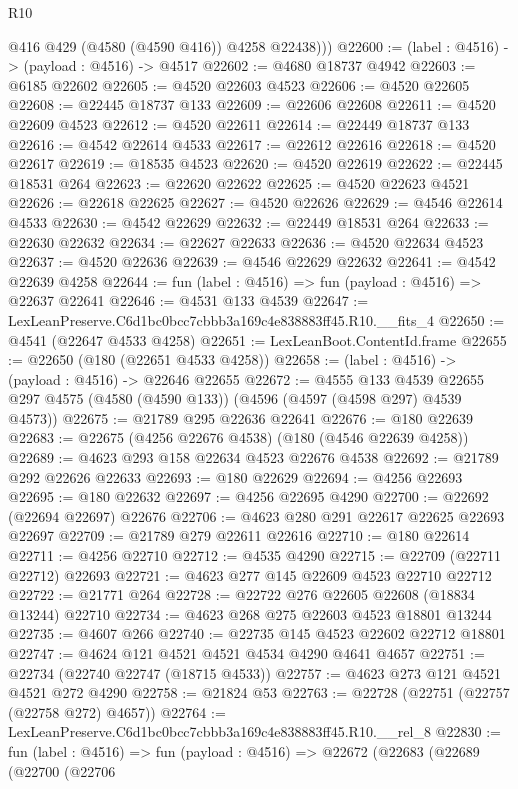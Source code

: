 \begin{lexlean}{R10}
\begin{coremodule}
          @416
          @429
          (@4580 (@4590 @416))
          @4258
          @22438)))
@22600 := (label : @4516) -> (payload : @4516) -> @4517
@22602 := @4680 @18737 @4942
@22603 := @6185 @22602
@22605 := @4520 @22603 @4523
@22606 := @4520 @22605
@22608 := @22445 @18737 @133
@22609 := @22606 @22608
@22611 := @4520 @22609 @4523
@22612 := @4520 @22611
@22614 := @22449 @18737 @133
@22616 := @4542 @22614 @4533
@22617 := @22612 @22616
@22618 := @4520 @22617
@22619 := @18535 @4523
@22620 := @4520 @22619
@22622 := @22445 @18531 @264
@22623 := @22620 @22622
@22625 := @4520 @22623 @4521
@22626 := @22618 @22625
@22627 := @4520 @22626
@22629 := @4546 @22614 @4533
@22630 := @4542 @22629
@22632 := @22449 @18531 @264
@22633 := @22630 @22632
@22634 := @22627 @22633
@22636 := @4520 @22634 @4523
@22637 := @4520 @22636
@22639 := @4546 @22629 @22632
@22641 := @4542 @22639 @4258
@22644 := fun (label : @4516) => fun (payload : @4516) => @22637 @22641
@22646 := @4531 @133 @4539
@22647 := LexLeanPreserve.C6d1bc0bcc7cbbb3a169c4e838883ff45.R10.__fits_4
@22650 := @4541 (@22647 @4533 @4258)
@22651 := LexLeanBoot.ContentId.frame
@22655 := @22650 (@180 (@22651 @4533 @4258))
@22658 := (label : @4516) -> (payload : @4516) -> @22646 @22655
@22672 := @4555
    @133
    @4539
    @22655
    @297
    @4575
    (@4580 (@4590 @133))
    (@4596 (@4597 (@4598 @297) @4539 @4573))
@22675 := @21789 @295 @22636 @22641
@22676 := @180 @22639
@22683 := @22675 (@4256 @22676 @4538) (@180 (@4546 @22639 @4258))
@22689 := @4623 @293 @158 @22634 @4523 @22676 @4538
@22692 := @21789 @292 @22626 @22633
@22693 := @180 @22629
@22694 := @4256 @22693
@22695 := @180 @22632
@22697 := @4256 @22695 @4290
@22700 := @22692 (@22694 @22697) @22676
@22706 := @4623 @280 @291 @22617 @22625 @22693 @22697
@22709 := @21789 @279 @22611 @22616
@22710 := @180 @22614
@22711 := @4256 @22710
@22712 := @4535 @4290
@22715 := @22709 (@22711 @22712) @22693
@22721 := @4623 @277 @145 @22609 @4523 @22710 @22712
@22722 := @21771 @264
@22728 := @22722 @276 @22605 @22608 (@18834 @13244) @22710
@22734 := @4623 @268 @275 @22603 @4523 @18801 @13244
@22735 := @4607 @266
@22740 := @22735 @145 @4523 @22602 @22712 @18801
@22747 := @4624 @121 @4521 @4521 @4534 @4290 @4641 @4657
@22751 := @22734 (@22740 @22747 (@18715 @4533))
@22757 := @4623 @273 @121 @4521 @4521 @272 @4290
@22758 := @21824 @53
@22763 := @22728 (@22751 (@22757 (@22758 @272) @4657))
@22764 := LexLeanPreserve.C6d1bc0bcc7cbbb3a169c4e838883ff45.R10.__rel_8
@22830 := fun (label : @4516) =>
  fun (payload : @4516) =>
  @22672
    (@22683
      (@22689
        (@22700
          (@22706

\end{coremodule}
\end{lexlean}
